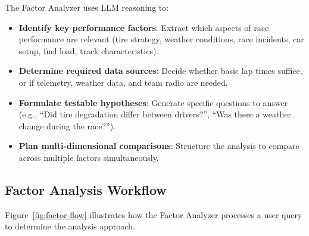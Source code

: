 \documentclass[11pt]{article}
\begin{document}
The Factor Analyzer uses LLM reasoning to:

\begin{itemize}[leftmargin=1.5em]
    \item \textbf{Identify key performance factors}: Extract which aspects of race performance are relevant (tire strategy, weather conditions, race incidents, car setup, fuel load, track characteristics).
    \item \textbf{Determine required data sources}: Decide whether basic lap times suffice, or if telemetry, weather data, and team radio are needed.
    \item \textbf{Formulate testable hypotheses}: Generate specific questions to answer (e.g., ``Did tire degradation differ between drivers?'', ``Was there a weather change during the race?'').
    \item \textbf{Plan multi-dimensional comparisons}: Structure the analysis to compare across multiple factors simultaneously.
\end{itemize}

\subsection{Factor Analysis Workflow}

Figure~\ref{fig:factor-flow} illustrates how the Factor Analyzer processes a user query to determine the analysis approach.
\end{document}
